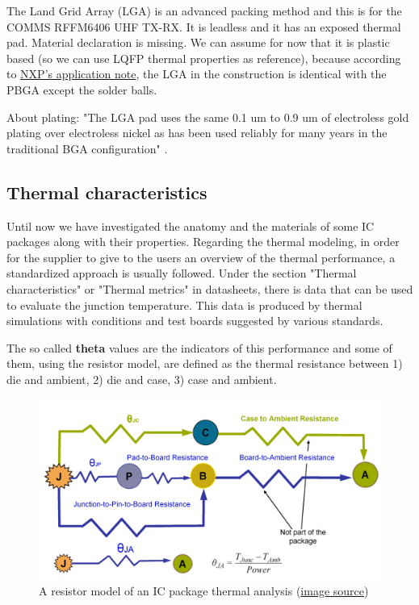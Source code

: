 \documentclass[final]{cubedoc}
\begin{document}
	The Land Grid Array (LGA) is an advanced packing method and this is for the COMMS RFFM6406 UHF TX-RX. It is leadless and it has an exposed thermal pad. Material declaration is missing. We can assume for now that it is plastic based (so we can use LQFP thermal properties as reference), because according to \href{https://web.archive.org/web/20200818134018/https://www.nxp.com/docs/en/application-note/AN2265.pdf}{NXP's application note}, the LGA in the construction is identical with the PBGA except the solder balls. 
	
	About plating: "The LGA pad uses the same 0.1 um to 0.9 um of electroless gold plating over electroless nickel as has been used reliably for many years in the traditional BGA configuration" \cite{nxpplating}.
	
	
	\subsection{Thermal characteristics}
	
	Until now we have investigated the anatomy and the materials of some IC packages along with their properties. Regarding the thermal modeling, in order for the supplier to give to the users an overview of the thermal performance, a standardized approach is usually followed. Under the section "Thermal characteristics" or "Thermal metrics" in datasheets,  there is data that can be used to evaluate the junction temperature. This data is produced by thermal simulations with conditions and test boards suggested by various standards.
	
	The so called \textbf{theta} values are the indicators of this performance and some of them, using the resistor model, are defined as the thermal resistance between 1) die and ambient, 2) die and case, 3) case and ambient.
	
	\begin{figure}[h!]
		\centering
		\includegraphics[keepaspectratio, width=\textwidth, height=.25\textheight]{docs/resistor_model.png}
		\caption{A resistor model of an IC package thermal analysis \small{(\href{https://web.archive.org/web/20200818173736/https://www.edn.com/ensuring-the-thermal-integrity-of-your-ic-package-pc-board-design/}{image source})}} 
		\label{fig:my_label}
	\end{figure}
	
\end{document}
